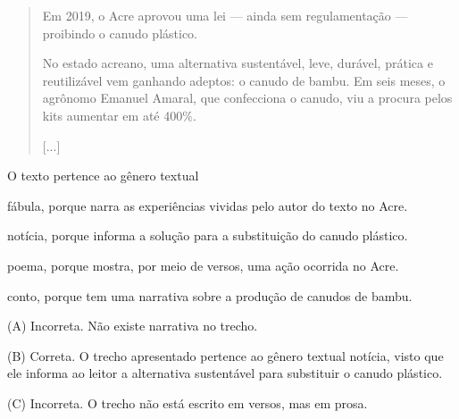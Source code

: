 \begin{escolha}
\begin{escolha}
{\begin{escolha}
\begin{quote}
Em 2019, o Acre aprovou uma lei --- ainda sem regulamentação ---
proibindo o canudo plástico.

No estado acreano, uma alternativa sustentável, leve, durável, prática e
reutilizável vem ganhando adeptos: o canudo de bambu. Em seis meses, o
agrônomo Emanuel Amaral, que confecciona o canudo, viu a procura pelos
kits aumentar em até 400\%.

{[}...{]}
\end{quote}


O texto pertence ao gênero textual

\begin{escolha}
\item fábula, porque narra as experiências vividas pelo autor do texto no Acre.

\item notícia, porque informa a solução para a substituição do canudo plástico.

\item poema, porque mostra, por meio de versos, uma ação ocorrida no Acre.

\item conto, porque tem uma narrativa sobre a produção de canudos de bambu.
\end{escolha}


(A) Incorreta. Não existe narrativa no trecho.

(B) Correta. O trecho apresentado pertence ao gênero textual notícia,
visto que ele informa ao leitor a alternativa sustentável para
substituir o canudo plástico.

(C) Incorreta. O trecho não está escrito em versos, mas em prosa.


\end{escolha}}
\end{escolha}
\end{escolha}
